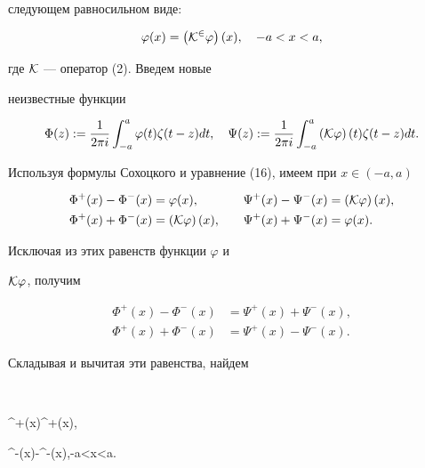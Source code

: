 следующем равносильном виде:


\begin{equation}


\varphi(x)=\left(\cal{K}^{2}\varphi\right)(x),\quad -a<x<a,


\end{equation}


где $\cal{K}$ --- оператор (2). Введем новые


неизвестные функции


$$


\Phi(z):=\dfrac{1}{2\pi i}\int^{a}_{-a}


\varphi(t)\zeta(t-z)dt,\quad


\Psi(z):=\dfrac{1}{2\pi i}\int^{a}_{-a}


\left(\cal{K}\varphi\right)(t)\zeta(t-z)dt.


$$


Используя формулы Сохоцкого и уравнение (16), имеем при $x\in


(-a,a)$


\begin{alignat*}{2}


\Phi^{+}(x)-\Phi^{-}(x)&=\varphi(x), &\quad


\Psi^{+}(x)-\Psi^{-}(x)&=\left(\cal{K}\varphi\right)(x), \\


%


\Phi^{+}(x)+\Phi^{-}(x)&=\left(\cal{K}\varphi\right)(x), &\quad


\Psi^{+}(x)+\Psi^{-}(x)&=\varphi(x).


\end{alignat*}


Исключая из этих равенств функции $\varphi$ и


$\cal{K}\varphi$, получим


\begin{align*}


\Phi^{+}(x)-\Phi^{-}(x)&=\Psi^{+}(x)+\Psi^{-}(x),\\


\Phi^{+}(x)+\Phi^{-}(x)&=\Psi^{+}(x)-\Psi^{-}(x).


\end{align*}


Складывая и вычитая эти равенства, найдем


$$


\Phi^{+}(x)\equiv \Psi^{+}(x),\quad


\Phi^{-}(x)\equiv -\Psi^{-}(x),\quad -a<x<a.


